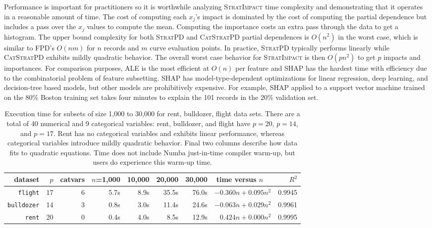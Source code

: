 \documentclass[smallextended]{svjour3}       %
\newcommand{\simp}{\fontfamily{cmr}\textsc{\small StratImpact}}
\newcommand{\spd}{\fontfamily{cmr}\textsc{\small StratPD}}
\newcommand{\cspd}{\fontfamily{cmr}\textsc{\small CatStratPD}}
\begin{document}
Performance is important for practitioners so it is worthwhile analyzing \simp{} time complexity and demonstrating that it operates in a reasonable amount of time.  The cost of computing each $x_j$'s impact is dominated by the cost of computing the partial dependence but includes a pass over the $x_j$ values to compute the mean. Computing the importance costs an extra pass through the data to get a histogram. The upper bound  complexity for both \spd{} and \cspd{} partial dependences is $O(n^2)$ in the worst case, which is  similar to FPD's $O(nm)$ for $n$ records and $m$ curve evaluation points.  In practice, \spd{} typically performs linearly while \cspd{} exhibits mildly quadratic behavior.  The overall worst case behavior for \simp{} is then $O(p n^2)$ to get $p$ impacts and importances.   For comparison purposes, ALE is the most efficient at $O(n)$ per feature and SHAP has the hardest time with efficiency due to the combinatorial problem of feature subsetting. SHAP has model-type-dependent optimizations for linear regression, deep learning, and decision-tree based models, but other models are prohibitively expensive. For example, SHAP applied to a support vector machine trained on the 80\% Boston training set takes four minutes to explain the 101 records in the 20\% validation set.

\begin{table}\small
\centering
\begin{tabular}{r r r r r r r r r}
{\bf dataset} & $p$ & catvars & {\small $n$=1,000} & {\small 10,000} & {\small 20,000} & {\small 30,000} & time versus $n$~~ & $R^2$\\
\hline
{\tt\small flight} & 17 & 6 & 5.7s & 8.9s & 35.5s & 76.0s & {\small $-0.360 n + 0.095 n^2$} & {\small 0.9945}\\
{\tt\small bulldozer} & 14 & 3 & 0.8s & 3.0s & 11.4s & 24.6s & {\small $-0.063 n + 0.029 n^2$} & {\small 0.9961}\\
{\tt\small rent} & 20 & 0 & 0.4s & 4.0s & 8.5s & 12.9s & {\small $0.424 n + 0.000 n^2$} & {\small 0.9995}\\
\end{tabular}
\vspace{-3mm}
\caption{\small  Execution time for subsets of size 1,000 to 30,000 for rent, bulldozer, flight data sets.  There are a total of 40 numerical and 9 categorical variables: rent, bulldozer, and flight have $p=20$, $p=14$, and $p=17$. Rent has no categorical variables and exhibits linear performance, whereas categorical variables introduce mildly quadratic behavior. Final two columns describe how data fits to quadratic equations. Time does not include Numba just-in-time compiler warm-up, but users do experience this warm-up time.}
\label{fig:timing}
\end{table}
\end{document}
